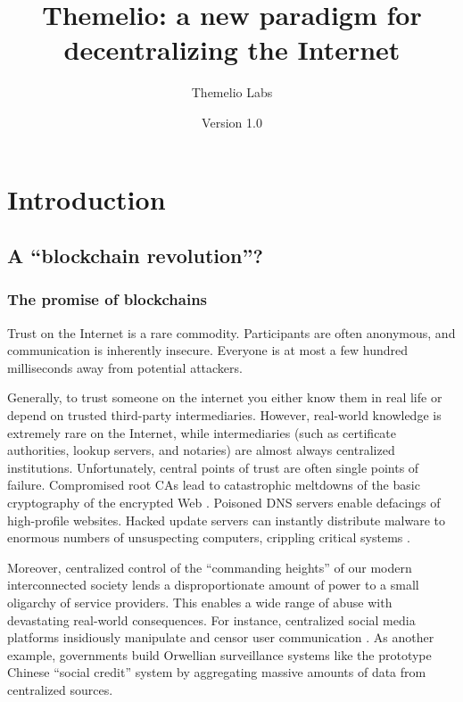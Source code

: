 \documentclass[headinclude,12pt]{scrbook}
\begin{document}
\raggedbottom
\title{Themelio: a new paradigm for decentralizing the Internet}
\author{Themelio Labs}
\date{Version 1.0}
\maketitle



\tableofcontents


\chapter{Introduction}

\section{A ``blockchain revolution''?}

\subsection{The promise of blockchains}

Trust on the Internet is a rare commodity. Participants are often anonymous, and communication is inherently insecure. Everyone is at most a few hundred milliseconds away from potential attackers.

Generally, to trust someone on the internet you either know them in real life or depend on trusted third-party intermediaries. However, real-world knowledge is extremely rare on the Internet, while intermediaries (such as certificate authorities, lookup servers, and notaries) are almost always centralized institutions. Unfortunately, central points of trust are often single points of failure. Compromised root CAs lead to catastrophic meltdowns of the basic cryptography of the encrypted Web \cite{prins2011diginotar}. Poisoned DNS servers enable defacings of high-profile websites. Hacked update servers can instantly distribute malware to enormous numbers of unsuspecting computers, crippling critical systems \cite{richardson2017ransomware}.

Moreover, centralized control of the ``commanding heights'' of our modern interconnected society lends a disproportionate amount of power to a small oligarchy of service providers. This enables a wide range of abuse with devastating real-world consequences. For instance, centralized social media platforms insidiously manipulate and censor user communication \cite{sunstein2018republic}. As another example, governments build Orwellian surveillance systems like the prototype Chinese ``social credit'' system \cite{wang11china} by aggregating massive amounts of data from centralized sources.
\end{document}

